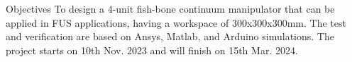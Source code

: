 Objectives
To design a 4-unit fish-bone continuum manipulator that can be applied in FUS applications, having a workspace of 300x300x300mm. 
The test and verification are based on Ansys, Matlab, and Arduino simulations. The project starts on 10th Nov. 2023 and will 
finish on 15th Mar. 2024.


\newpage